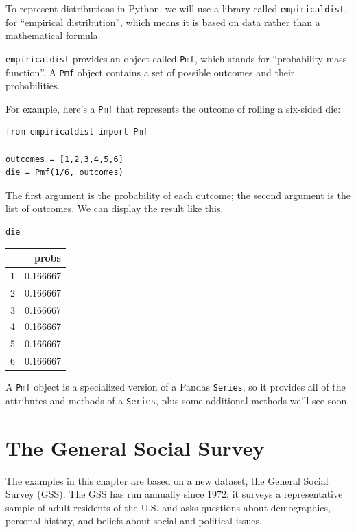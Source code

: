 To represent distributions in Python, we will use a library called
\passthrough{\lstinline!empiricaldist!}, for ``empirical distribution'',
which means it is based on data rather than a mathematical formula.

\passthrough{\lstinline!empiricaldist!} provides an object called
\passthrough{\lstinline!Pmf!}, which stands for ``probability mass
function''. A \passthrough{\lstinline!Pmf!} object contains a set of
possible outcomes and their probabilities.

For example, here's a \passthrough{\lstinline!Pmf!} that represents the
outcome of rolling a six-sided die:

\begin{lstlisting}[]
from empiricaldist import Pmf

outcomes = [1,2,3,4,5,6]
die = Pmf(1/6, outcomes)
\end{lstlisting}

The first argument is the probability of each outcome; the second
argument is the list of outcomes. We can display the result like this.

\begin{lstlisting}[]
die
\end{lstlisting}

\begin{tabular}{lr}
\midrule
{} &     probs \\
\midrule
1 &  0.166667 \\
2 &  0.166667 \\
3 &  0.166667 \\
4 &  0.166667 \\
5 &  0.166667 \\
6 &  0.166667 \\
\midrule
\end{tabular}

A \passthrough{\lstinline!Pmf!} object is a specialized version of a
Pandas \passthrough{\lstinline!Series!}, so it provides all of the
attributes and methods of a \passthrough{\lstinline!Series!}, plus some
additional methods we'll see soon.

\hypertarget{the-general-social-survey}{%
\section{The General Social Survey}\label{the-general-social-survey}}

The examples in this chapter are based on a new dataset, the General
Social Survey (GSS). The GSS has run annually since 1972; it surveys a
representative sample of adult residents of the U.S. and asks questions
about demographics, personal history, and beliefs about social and
political issues.


